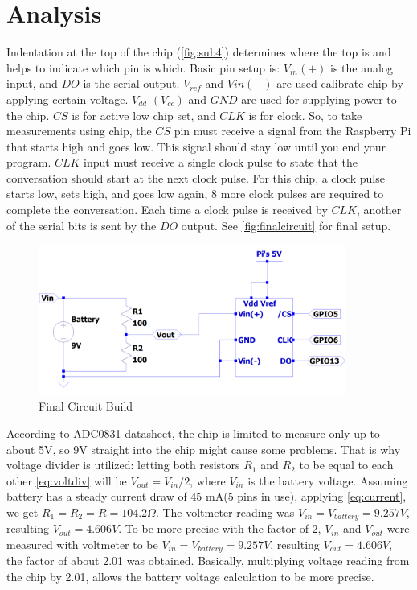 \section{Analysis}
Indentation at the top of the chip (\autoref{fig:sub4}) determines where the top is and helps to indicate which pin is which.  Basic pin setup is: $V_{in}(+)$ is the analog input, and $DO$ is the serial output. $V_{ref}$ and   $Vin(-)$ are used calibrate chip by applying certain voltage. $V_{dd}$ $(V_{cc})$ and $GND$ are used for supplying power to the chip. $CS$ is for active low chip set, and $CLK$ is for clock. So, to take measurements using chip, the $CS$ pin must receive a signal from the Raspberry Pi that starts high and goes low. This signal should stay low until you end your program. $CLK$ input must receive a single clock pulse to state that the conversation should start at the next clock pulse. For this chip, a clock pulse starts low, sets high, and goes low again, 8 more clock pulses are required to complete the conversation. Each time a clock pulse is received by $CLK$, another of the serial bits is sent by the $DO$ output. See \autoref{fig:finalcircuit} for final setup.
\begin{figure}[h]
\centering
\includegraphics[width=0.9\textwidth]{finalcircuit.png}
\caption{Final Circuit Build}
\label{fig:finalcircuit}
\end{figure}\newline
According to ADC0831 datasheet\citep{adcdatasheet}, the chip is limited to measure only up to about 5V, so 9V straight into the chip might cause some problems. That is why voltage divider is utilized: letting both resistors $R_1$ and $R_2$ to be equal to each other \autoref{eq:voltdiv} will be $V_{out} = V_{in}/2$, where $V_{in}$ is the battery voltage. Assuming battery has a steady current draw of 45 mA(5 pins in use)\citep{current}, applying \autoref{eq:current}, we get $R_1 = R_2 = R=104.2\Omega$. The voltmeter reading was $V_{in} = V_{battery} = 9.257V$, resulting $V_{out} = 4.606V$. To be more precise with the factor of 2, $V_{in}$ and $V_{out}$ were measured with voltmeter to be $V_{in} = V_{battery} = 9.257V$, resulting $V_{out} = 4.606V$, the factor of about 2.01 was obtained. Basically, multiplying voltage reading from the chip by 2.01, allows the battery voltage calculation to be more precise. \newline

